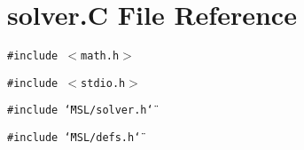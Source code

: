 \section{solver.C File Reference}
\label{solver_8C}
{\tt \#include $<$math.h$>$}\par
{\tt \#include $<$stdio.h$>$}\par
{\tt \#include \char`\"{}MSL/solver.h\char`\"{}}\par
{\tt \#include \char`\"{}MSL/defs.h\char`\"{}}\par
